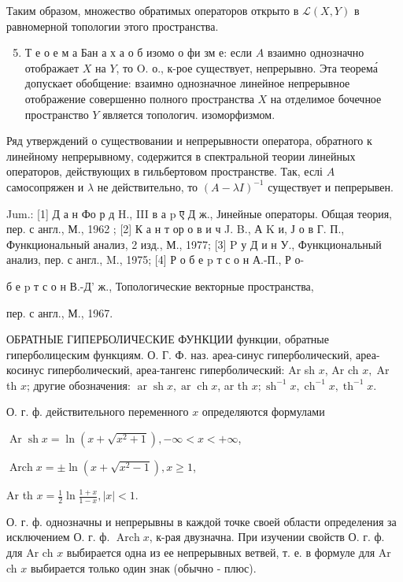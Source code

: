 \documentclass[10pt]{article}
\begin{document}
Таким образом, множество обратимых операторов открыто в $\mathscr{L}(X, Y)$ в равномерной топологии этого пространства.



\begin{enumerate}

  \setcounter{enumi}{4}

  \item Т е о е м а Бан а х а о б изомо о фи зм е: если $A$ взаимно однозначно отображает $X$ на $Y$, то O. о., к-рое существует, непрерывно. Эта теорема́ допускает обобщение: взаимно однозначное линейное непрерывное отображение совершенно полного пространства $X$ на отделимое бочечное пространство $Y$ является топологич. изоморфизмом.

\end{enumerate}



Ряд утверждений о существовании и непрерывности оператора, обратного к линейному непрерывному, содержится в спектральной теории линейных операторов, действующих в гильбертовом пространстве. Так, еслі $A$ самосопряжен и $\lambda$ не действительно, то $(A-\lambda I)^{-1}$ существует и пепрерывен.



Jum.: [1] Д а н Фо р д H., III в а p ए Д ж., Јинейные операторы. Общая теория, пер. с англ., М., 1962 ; [2] К а н т ор о в и ч J. B., А K и, Ј о в Г. П., Функциональный анализ, 2 изд., М., 1977; [3] P у Д и н У., Функциональный анализ, пер. с англ., M., 1975; [4] Р о б е p т с о н А.-П., Р о-

б е p т с о н В.-Д' ж., Топологические векторные пространства,

пер. с англ., М., 1967.



ОБРАТНЫЕ ГИПЕРБОЛИЧЕСКИЕ ФУНКЦИИ функции, обратные гиперболицеским функциям. О. Г. Ф. наз. ареа-синус гиперболический, ареа-косинус гиперболический, ареа-тангенс гиперболический: Ar sh $x$, Ar ch $x, \operatorname{Ar}$ th $x$; другие обозначения: $\operatorname{ar} \operatorname{sh} x, \operatorname{ar} \operatorname{ch} x$, ar th $x ; \operatorname{sh}^{-1} x, \operatorname{ch}^{-1} x, \operatorname{th}^{-1} x$.



О. г. ф. действительного переменного $x$ определяются формулами



$\operatorname{Ar} \operatorname{sh} x=\ln \left(x+\sqrt{x^{2}+1}\right),-\infty<x<+\infty$,



$\operatorname{Arch} x= \pm \ln \left(x+\sqrt{x^{2}-1}\right), x \geqslant 1$,



Ar th $x=\frac{1}{2} \ln \frac{1+x}{1-x},|x|<1$.



О. г. ф. однозначны и непрерывны в каждой точке своей области определения за исключением О. г. ф. $\operatorname{Arch} x$, к-рая двузначна. При изучении свойств О. г. ф. для Ar ch $x$ выбирается одна из ее непрерывных ветвей, т. е. в формуле для Ar ch $x$ выбирается только один знак (обычно - плюс).
\end{document}
